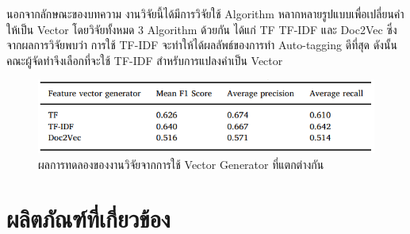 \documentclass[12pt,oneside,openright,a4paper]{cpe-thai-project}
\begin{document}
    \hspace{1cm}นอกจากลักษณะของบทความ งานวิจัยนี้ได้มีการวิจัยใช้ Algorithm หลากหลายรูปแบบเพื่อเปลี่ยนคำให้เป็น Vector โดยวิจัยทั้งหมด 3 Algorithm ด้วยกัน
    ได้แก่ TF TF-IDF และ Doc2Vec ซึ่งจากผลการวิจัยพบว่า การใช้ TF-IDF จะทำให้ได้ผลลัพธ์ของการทำ Auto-tagging ดีที่สุด ดังนั้นคณะผู้จัดทำจึงเลือกที่จะใช้ TF-IDF
    สำหรับการแปลงคำเป็น Vector

    \begin{figure}[!ht]\centering
      \includegraphics[width=13cm]{./img/vector.png}
      \caption{ผลการทดลองของงานวิจัยจากการใช้ Vector Generator ที่แตกต่างกัน}\label{fig:vector}
    \end{figure}

\section{ผลิตภัณฑ์ที่เกี่ยวข้อง}
\end{document}
